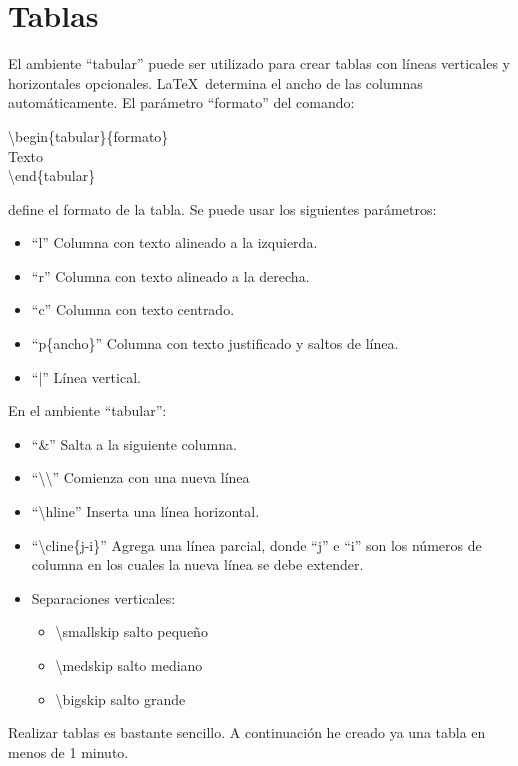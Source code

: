\documentclass{article}
\begin{document}
\section{Tablas}
El ambiente ``tabular'' puede ser utilizado para crear tablas con l\'ineas verticales y
horizontales opcionales. \LaTeX\ determina el ancho de las columnas autom\'aticamente.
El par\'ametro ``formato'' del comando:


\begin{center}
\textbackslash begin\{tabular\}\{formato\}\\
Texto\\
\textbackslash end\{tabular\}
\end{center}


define el formato de la tabla. Se puede usar los siguientes par\'ametros:

\begin{itemize}
\item ``l'' Columna con texto alineado a la izquierda.
\item ``r'' Columna con texto alineado a la derecha.
\item ``c'' Columna con texto centrado.
\item ``p\{ancho\}'' Columna con texto justificado y saltos de l\'inea.
\item ``|'' L\'inea vertical.
\end{itemize} 


En el ambiente ``tabular'':
\begin{itemize}
\item ``\&'' Salta a la siguiente columna.
\item ``\textbackslash \textbackslash'' Comienza con una nueva l\'inea
\item ``\textbackslash hline'' Inserta una l\'inea horizontal.
\item ``\textbackslash cline\{j-i\}'' Agrega una l\'inea parcial, donde ``j'' e ``i'' son
los n\'umeros de columna en los cuales la nueva l\'inea se debe extender.
\item Separaciones verticales:
\begin{itemize}
\item \textbackslash smallskip salto peque\~no
\item \textbackslash medskip salto mediano
\item \textbackslash bigskip salto grande
\end{itemize}
\end{itemize}

Realizar tablas es bastante sencillo. A continuaci\'on he creado ya una tabla en menos de 1 minuto.
\end{document}
